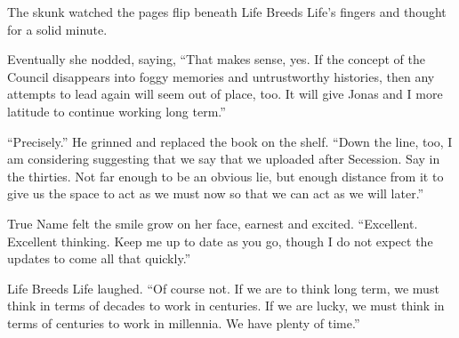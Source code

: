 The skunk watched the pages flip beneath Life Breeds Life's fingers and thought for a solid minute.

Eventually she nodded, saying, ``That makes sense, yes. If the concept of the Council disappears into foggy memories and untrustworthy histories, then any attempts to lead again will seem out of place, too. It will give Jonas and I more latitude to continue working long term.''

``Precisely.'' He grinned and replaced the book on the shelf. ``Down the line, too, I am considering suggesting that we say that we uploaded after Secession. Say in the thirties. Not far enough to be an obvious lie, but enough distance from it to give us the space to act as we must now so that we can act as we will later.''

True Name felt the smile grow on her face, earnest and excited. ``Excellent. Excellent thinking. Keep me up to date as you go, though I do not expect the updates to come all that quickly.''

Life Breeds Life laughed. ``Of course not. If we are to think long term, we must think in terms of decades to work in centuries. If we are lucky, we must think in terms of centuries to work in millennia. We have plenty of time.''
